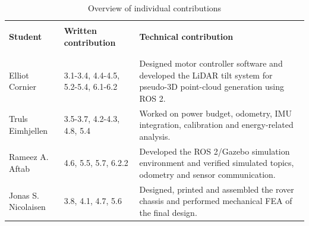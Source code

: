 \begin{table}[h]
\centering
\caption{Overview of individual contributions}
\label{tab:contributions}
\begin{tabular}{
    p{}
    p{}
    p{}
}
\toprule\\
\textbf{Student} & \textbf{Written contribution} & \textbf{Technical contribution} \\
&  &  \\[4pt]
\midrule\\[6pt]
Elliot Cornier & 3.1-3.4, 4.4-4.5, 5.2-5.4, 6.1-6.2 & Designed motor controller software and developed the LiDAR tilt system for pseudo-3D point-cloud generation using ROS 2. \\

Truls Eimhjellen & 3.5-3.7, 4.2-4.3, 4.8, 5.4 & Worked on power budget, odometry, IMU integration, calibration and energy-related analysis. \\

Rameez A. Aftab & 4.6, 5.5, 5.7, 6.2.2 & Developed the ROS 2/Gazebo simulation environment and verified simulated topics, odometry and sensor communication. \\

Jonas S. Nicolaisen & 3.8, 4.1, 4.7, 5.6  & Designed, printed and assembled the rover chassis and performed mechanical FEA of the final design. \\
\bottomrule
\end{tabular}
\end{table}